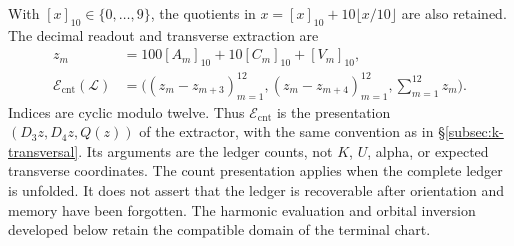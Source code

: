 With \([x]_{10}\in\{0,\ldots,9\}\), the quotients in
\(x=[x]_{10}+10\lfloor x/10\rfloor\) are also retained. The decimal
readout and transverse extraction are
\[
\begin{aligned}
 z_m&=100[A_m]_{10}+10[C_m]_{10}+[V_m]_{10},\\
 \mathcal E_{\mathrm{cnt}}(\mathscr L)
   &=\bigl((z_m-z_{m+3})_{m=1}^{12},
           (z_m-z_{m+4})_{m=1}^{12},\sum_{m=1}^{12}z_m\bigr).
\end{aligned}
\]
Indices are cyclic modulo twelve. Thus \(\mathcal E_{\mathrm{cnt}}\)
is the presentation \((D_3z,D_4z,Q(z))\) of the extractor, with the same
convention as in \S\ref{subsec:k-transversal}. Its arguments are the
ledger counts, not \(K\), \(U\), alpha, or expected transverse coordinates.
The count presentation applies when the complete ledger is unfolded.
It does not assert that the ledger is recoverable after orientation and
memory have been forgotten. The harmonic evaluation and orbital inversion
developed below retain the compatible domain of the terminal chart.
